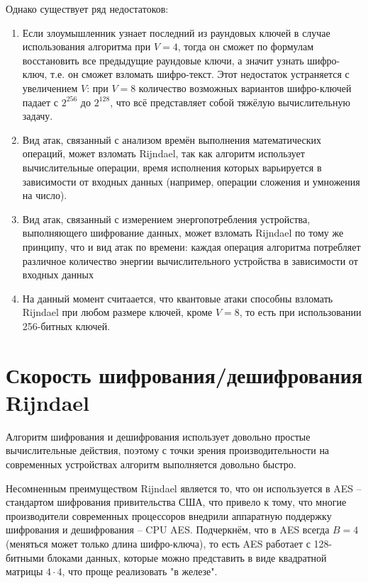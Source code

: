     Однако существует ряд недостатоков:
    \begin{enumerate}
        \item Если злоумышленник узнает последний из раундовых ключей в случае использования алгоритма при $V = 4$,
        тогда он сможет по формулам восстановить все предыдущие раундовые ключи, а значит узнать шифро-ключ, т.е.
        он сможет взломать шифро-текст. Этот недостаток устраняется с увеличением $V$: при $V = 8$ количество возможных
        вариантов шифро-ключей падает с $2^{256}$ до $2^{128}$, что всё представляет собой тяжёлую вычислительную задачу.
        \item Вид атак, связанный с анализом времён выполнения математических операций, может взломать Rijndael, так как
        алгоритм использует вычислительные операции, время исполнения которых варьируется в зависимости от входных данных
        (например, операции сложения и умножения на число).
        \item Вид атак, связанный с измерением энергопотребления устройства, выполняющего шифрование данных, может
        взломать Rijndael по тому же принципу, что и вид атак по времени: каждая операция алгоритма потребляет различное
        количество энергии вычислительного устройства в зависимости от входных данных
        \item На данный момент считаается, что квантовые атаки способны взломать Rijndael при любом размере ключей,
        кроме $V = 8$, то есть при использовании 256-битных ключей.
    \end{enumerate}

\section{Скорость шифрования/дешифрования Rijndael}

    Алгоритм шифрования и дешифрования использует довольно простые вычислительные действия, поэтому с точки
    зрения производительности на современных устройствах алгоритм выполняется довольно быстро.

    Несомненным преимуществом Rijndael является то, что он используется в AES -- стандартом шифрования
    привительства США, что привело к тому, что многие производители современных процессоров внедрили
    аппаратную поддержку шифрования и дешифрования -- CPU AES. Подчеркнём, что в AES всегда $B = 4$
    (меняться может только длина шифро-ключа), то есть AES работает с 128-битными блоками данных,
    которые можно представить в виде квадратной матрицы $4 \cdot 4$,
    что проще реализовать "в железе".


